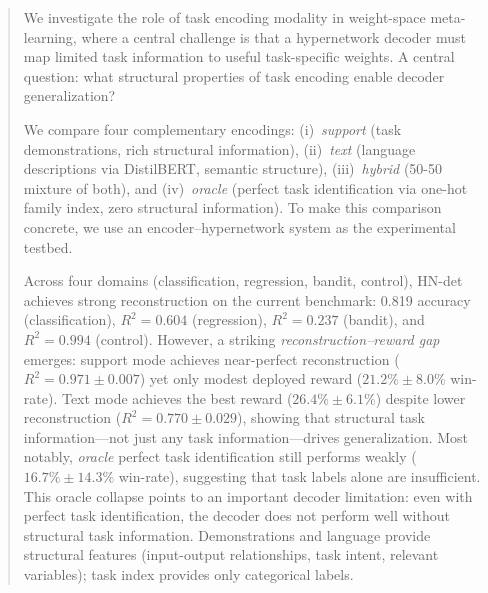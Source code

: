 \begin{abstract}
We investigate the role of task encoding modality in weight-space meta-learning, where a central challenge is that a hypernetwork decoder must map limited task information to useful task-specific weights.
A central question: what structural properties of task encoding enable decoder generalization?

We compare four complementary encodings: (i)~\emph{support} (task demonstrations, rich structural information), (ii)~\emph{text} (language descriptions via DistilBERT, semantic structure), (iii)~\emph{hybrid} (50-50 mixture of both), and (iv)~\emph{oracle} (perfect task identification via one-hot family index, zero structural information).
To make this comparison concrete, we use an encoder--hypernetwork system as the experimental testbed.

Across four domains (classification, regression, bandit, control), HN-det achieves strong reconstruction on the current benchmark: 0.819 accuracy (classification), $R^2 = 0.604$ (regression), $R^2 = 0.237$ (bandit), and $R^2 = 0.994$ (control).
However, a striking \emph{reconstruction--reward gap} emerges: support mode achieves near-perfect reconstruction ($R^2 = 0.971 \pm 0.007$) yet only modest deployed reward ($21.2\% \pm 8.0\%$ win-rate).
Text mode achieves the best reward ($26.4\% \pm 6.1\%$) despite lower reconstruction ($R^2 = 0.770 \pm 0.029$), showing that structural task information---not just any task information---drives generalization.
Most notably, \emph{oracle} perfect task identification still performs weakly ($16.7\% \pm 14.3\%$ win-rate), suggesting that task labels alone are insufficient.
This oracle collapse points to an important decoder limitation: even with perfect task identification, the decoder does not perform well without structural task information.
Demonstrations and language provide structural features (input-output relationships, task intent, relevant variables); task index provides only categorical labels.
\end{abstract}
